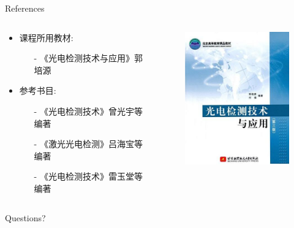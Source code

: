 \documentclass[10pt]{beamer}
\begin{document}
\begin{frame}{References}
   \begin{columns}
        \begin{column}{0.6\textwidth}
        
         \begin{itemize}
        \item \alert{课程所用教材:}\cite{coursebook}
        \begin{itemize}
            \item[-] 《光电检测技术与应用》郭培源
        \end{itemize}
        \item \alert{参考书目:}\cite{cbook1,cbook2,cbook3}
        \begin{itemize}
            \item[-] 《光电检测技术》曾光宇等编著
            \item[-] 《激光光电检测》吕海宝等编著
            \item[-] 《光电检测技术》雷玉堂等编著
        \end{itemize}
    \end{itemize}
        \end{column}
        \begin{column}{0.4\textwidth}
        \begin{figure}[htbp] 
        \centering\includegraphics[width=2.0in]{source/pdt.jpg} 
        \end{figure} 
        
        \end{column}
        \end{columns}
  
 
\end{frame}


\begin{frame}[standout]
  Questions?
\end{frame}
\end{document}
